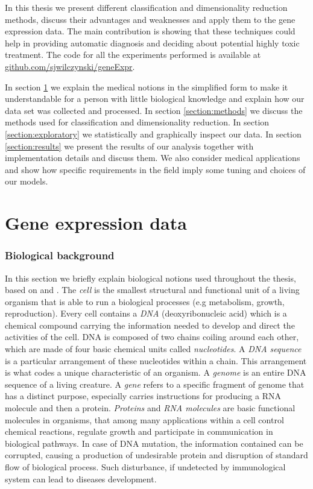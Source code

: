 \documentclass[shortabstract, english, mgr]{iithesis}
\begin{document}
In this thesis we present different classification and dimensionality reduction methods, discuss their advantages and weaknesses and apply them to the gene expression data. The main contribution is showing that these techniques could help in providing automatic diagnosis and deciding about potential highly toxic treatment. The code for all the experiments performed is available at \url{github.com/sjwilczynski/geneExpr}.  


In section \ref{section:bio} we explain the medical notions in the simplified form to make it understandable for a person with little biological knowledge and explain how our data set was collected and processed. In section \ref{section:methods} we discuss the methods used for classification and dimensionality reduction. In section \ref{section:exploratory} we statistically and graphically inspect our data. In section \ref{section:results} we present the results of our analysis together with implementation details and discuss them. We also consider medical applications and show how specific requirements in the field imply some tuning and choices of our models.

\section{Gene expression data} \label{section:bio}

\subsubsection{Biological background} 
In this section we briefly explain biological notions used throughout the thesis, based on \cite{NHGRI} and \cite[chapters~11,12]{GeneExpr}. The \textit{cell} is the smallest structural and functional unit of a living organism that is able to run a biological processes (e.g metabolism, growth, reproduction). Every cell contains a \textit{DNA} (deoxyribonucleic acid) which is a chemical compound carrying the information needed to develop and direct the activities of the cell. DNA is composed of two chains coiling around each other, which are made of four basic chemical units called \textit{nucleotides}. A \textit{DNA sequence} is a particular arrangement of these nucleotides within a chain. This arrangement is what codes a unique characteristic of an organism. A \textit{genome} is an entire DNA sequence of a living creature. A \textit{gene} refers to a specific fragment of genome that has a distinct purpose, especially carries instructions for producing a RNA molecule and then a protein. \textit{Proteins} and \textit{RNA molecules} are basic functional molecules in organisms, that among many applications within a cell control chemical reactions, regulate growth and participate in communication in biological pathways. In case of DNA mutation, the information contained can be corrupted, causing a production of undesirable protein and disruption of standard flow of biological process. Such disturbance, if undetected by immunological system can lead to diseases development.
\end{document}
